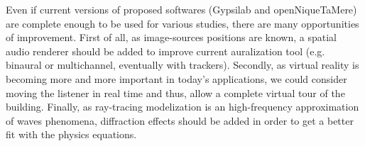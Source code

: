 \documentclass[AMA,STIX1COL]{WileyNJD-v2}
\begin{document}
Even if current versions of proposed softwares (Gypsilab \cite{githubGypsi} and openNiqueTaMere) are complete enough to be used for various studies, there are many opportunities of improvement. First of all, as image-sources positions are known, a spatial audio renderer should be added to improve current auralization tool (e.g. binaural or multichannel, eventually with trackers). Secondly, as virtual reality is becoming more and more important in today's applications, we could consider moving the listener in real time and thus, allow a complete virtual tour of the building. Finally, as ray-tracing modelization is an high-frequency approximation of waves phenomena, diffraction effects should be added in order to get a better fit with the physics equations. 
%
%
\end{document}
